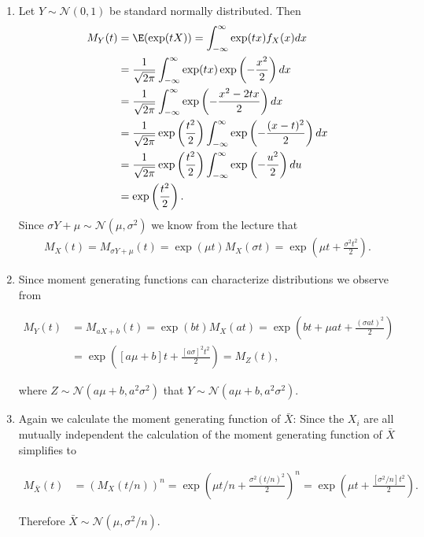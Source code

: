 \begin{solution}

\phantom{}

\begin{enumerate}[label = (\alph*)]
  \item Let $Y \sim \mathcal{N}(0,1)$ be standard normally distributed. Then
  \begin{align*}
    M_Y(t) &= \E(\exp(tX)) = \int_{-\infty}^{\infty}\exp(tx)f_X(x)dx \\
    &= \frac{1}{\sqrt{2\pi}}\int_{-\infty}^{\infty}\exp(tx)\exp\left(-\frac{x^2}{2}\right)dx \\
    &= \frac{1}{\sqrt{2\pi}}\int_{-\infty}^{\infty}\exp\left(-\frac{x^2 - 2tx}{2}\right)dx \\
    &= \frac{1}{\sqrt{2\pi}}\exp\left(\frac{t^2}{2}\right)\int_{-\infty}^{\infty}\exp\left(-\frac{(x-t)^2}{2}\right)dx \\
    &= \frac{1}{\sqrt{2\pi}}\exp\left(\frac{t^2}{2}\right)\int_{-\infty}^{\infty}\exp\left(-\frac{u^2}{2}\right)du \\
    &= \exp\left(\frac{t^2}{2}\right).
  \end{align*}
  Since $\sigma Y + \mu \sim \mathcal{N}(\mu,\sigma^2)$ we know from the lecture that
  \begin{align*}
    M_X(t) = M_{\sigma Y + \mu}(t) = \exp(\mu t)M_X(\sigma t) = \exp\left(\mu t + \frac{\sigma^2 t^2}{2}\right).
  \end{align*}

  \item Since moment generating functions can characterize distributions we observe from

  \begin{align*}
    M_Y(t) &= M_{aX + b}(t) = \exp(bt)M_X(at) = \exp\left(bt + \mu at + \frac{(\sigma at)^2}{2}\right) \\
    &= \exp\left( [a\mu + b]t + \frac{[a\sigma]^2 t^2}{2}\right) = M_Z(t),
  \end{align*}

  where $Z \sim \mathcal{N}(a\mu + b, a^2\sigma^2)$ that $Y \sim \mathcal{N}(a\mu + b, a^2\sigma^2)$.

  \item Again we calculate the moment generating function of $\bar{X}$:
  Since the $X_i$ are all mutually independent the calculation of the
  moment generating function of $\bar{X}$ simplifies to

  \begin{align*}
    M_{\bar{X}}(t) &= (M_X(t/n))^n =
    \exp\left(\mu t/n +  \frac{\sigma^2 (t/n)^2}{2}\right)^n =
    \exp\left(\mu t +  \frac{[\sigma^2/n] t^2}{2}\right).
  \end{align*}

  Therefore $\bar{X} \sim \mathcal{N}(\mu, \sigma^2/n)$.
\end{enumerate}



\end{solution}

